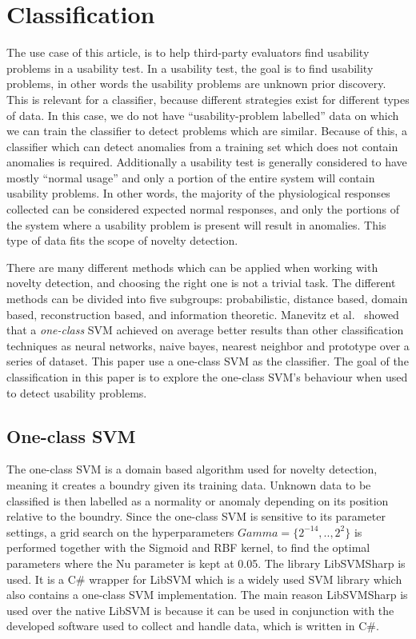 \section{Classification}
The use case of this article, is to help third-party evaluators find usability problems in a usability test.
In a usability test, the goal is to find usability problems, in other words the usability problems are unknown prior discovery. This is relevant for a classifier, because different strategies exist for different types of data. In this case, we do not have ``usability-problem labelled'' data on which we can train the classifier to detect problems which are similar. Because of this, a classifier which can detect anomalies from a training set which does not contain anomalies is required.
Additionally a usability test is generally considered to have mostly ``normal usage'' and only a portion of the entire system will contain usability problems. In other words, the majority of the physiological responses collected can be considered expected normal responses, and only the portions of the system where a usability problem is present will result in anomalies.
This type of data fits the scope of novelty detection\cite{noveltyDetection}.

There are many different methods which can be applied when working with novelty detection\cite{noveltyDetection}, and choosing the right one is not a trivial task.
The different methods can be divided into five subgroups: probabilistic, distance based, domain based, reconstruction based, and information theoretic.
Manevitz et al.~\cite{oneClassSVM} showed that a \textit{one-class} SVM achieved on average better results than other classification techniques as neural networks, naive bayes, nearest neighbor and prototype over a series of dataset.
This paper use a one-class SVM as the classifier.
The goal of the classification in this paper is to explore the one-class SVM's behaviour when used to detect usability problems.

\subsection{One-class SVM}
The one-class SVM is a domain based algorithm used for novelty detection, meaning it creates a boundry given its training data.
Unknown data to be classified is then labelled as a normality or anomaly depending on its position relative to the boundry.
Since the one-class SVM is sensitive\cite{oneClassSVM} to its parameter settings, a grid search on the hyperparameters $Gamma = \{2^{-14},..,2^2\}$ is performed together with the Sigmoid and RBF kernel, to find the optimal parameters where the Nu parameter is kept at 0.05.
The library LibSVMSharp\cite{libsvmsharp} is used. It is a C# wrapper for LibSVM\cite{libsvm} which is a widely used SVM library which also contains a one-class SVM implementation. The main reason LibSVMSharp is used over the native LibSVM is because it can be used in conjunction with the developed software used to collect and handle data, which is written in C#.

